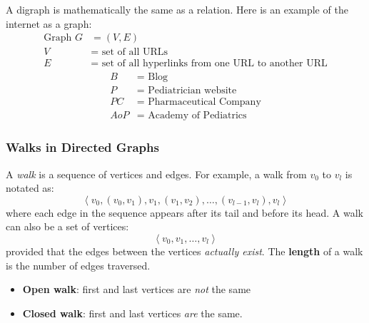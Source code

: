A digraph is mathematically the same as a relation. Here is an example of the internet as a graph:
\begin{align*}
  \text{Graph } G & = (V,E)                                                     \\
  V               & = \text{ set of all URLs}                                   \\
  E               & = \text{ set of all hyperlinks from one URL to another URL}
\end{align*}
\begin{align*}
  B   & = \text{ Blog}                   \\
  P   & = \text{ Pediatrician website}   \\
  PC  & = \text{ Pharmaceutical Company} \\
  AoP & = \text{ Academy of Pediatrics}
\end{align*}
\begin{center}
\end{center}

\subsubsection*{Walks in Directed Graphs}

A \textit{walk} is a sequence of vertices and edges. For example, a walk from $v_0$ to $v_l$ is notated as:
\[
  \left\langle v_0,(v_0,v_1), v_1,(v_1,v_2), \ldots,(v_{l-1},v_l), v_l\right\rangle
\]
where each edge in the sequence appears after its tail and before its head. A walk can also be a set of vertices:
\[
  \left\langle v_0, v_1, \ldots, v_l\right\rangle
\]
provided that the edges between the vertices \textit{actually exist}.
The \textbf{length} of a walk is the number of edges traversed.
\begin{itemize}
  \item \textbf{Open walk}: first and last vertices are \textit{not} the same
  \item \textbf{Closed walk}: first and last vertices \textit{are} the same.
\end{itemize}

